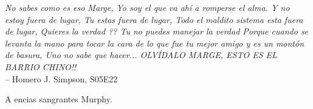 \begin{flushright}
	\begin{footnotesize}
		
		\textit{No sabes como es eso Marge, Yo soy el que va ahí a romperse el alma. Y no estoy fuera de lugar, Tu estas fuera de lugar, Todo el maldito sistema esta fuera de lugar, Quieres la verdad ?? Tu no puedes manejar la verdad Porque cuando se levanta la mano para tocar la cara de lo que fue tu mejor amigo y es un montón de basura, Uno no sabe que hacer... OLVÍDALO MARGE, ESTO ES EL BARRIO CHINO!!}\\        
		-- Homero J. Simpson, S05E22
		
	\end{footnotesize}
\vspace{1cm}
A encias sangrantes Murphy.
\end{flushright}

